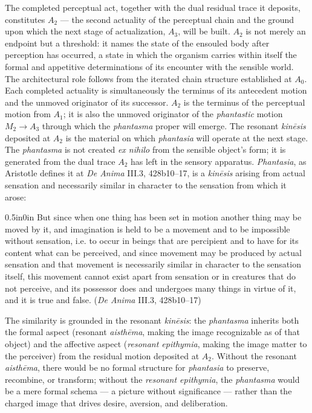 The completed perceptual act, together with the dual residual trace it deposits, constitutes $A_2$ --- the second actuality of the perceptual chain and the ground upon which the next stage of actualization, $A_3$, will be built. $A_2$ is not merely an endpoint but a threshold: it names the state of the ensouled body after perception has occurred, a state in which the organism carries within itself the formal and appetitive determinations of its encounter with the sensible world. The architectural role follows from the iterated chain structure established at $A_0$. Each completed actuality is simultaneously the terminus of its antecedent motion and the unmoved originator of its successor. $A_2$ is the terminus of the perceptual motion from $A_1$; it is also the unmoved originator of the \textit{phantastic} motion $M_2 \rightarrow A_3$ through which the \textit{phantasma} proper will emerge. The resonant \textit{kinēsis} deposited at $A_2$ is the material on which \textit{phantasia} will operate at the next stage. The \textit{phantasma} is not created \textit{ex nihilo} from the sensible object's form; it is generated from the dual trace $A_2$ has left in the sensory apparatus. \textit{Phantasia}, as Aristotle defines it at \textit{De Anima} III.3, 428b10--17, is a \textit{kinēsis} arising from actual sensation and necessarily similar in character to the sensation from which it arose:
\begin{adjustwidth}{0.5in}{0in}
But since when one thing has been set in motion another thing may be moved by it, and imagination is held to be a movement and to be impossible without sensation, i.e. to occur in beings that are percipient and to have for its content what can be perceived, and since movement may be produced by actual sensation and that movement is necessarily similar in character to the sensation itself, this movement cannot exist apart from sensation or in creatures that do not perceive, and its possessor does and undergoes many things in virtue of it, and it is true and false. (\textit{De Anima} III.3, 428b10--17)
\end{adjustwidth}
The similarity is grounded in the resonant \textit{kinēsis}: the \textit{phantasma} inherits both the formal aspect (resonant \textit{aisthēma}, making the image recognizable as of that object) and the affective aspect (\textit{resonant epithymia}, making the image matter to the perceiver) from the residual motion deposited at $A_2$. Without the resonant \textit{aisthēma}, there would be no formal structure for \textit{phantasia} to preserve, recombine, or transform; without the \textit{resonant epithymia}, the \textit{phantasma} would be a mere formal schema --- a picture without significance --- rather than the charged image that drives desire, aversion, and deliberation.

